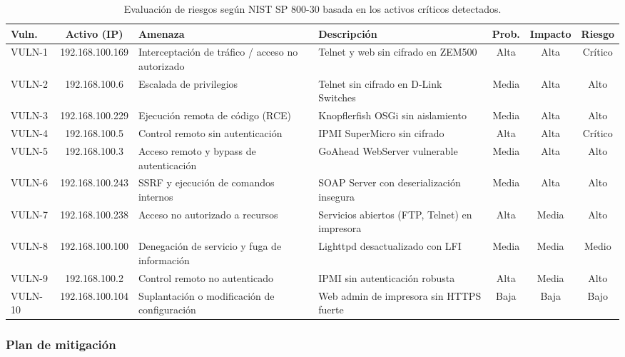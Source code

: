 \documentclass[a4paper, 11pt]{article}
\begin{document}
\begin{table}[H]
\centering
\small
\begin{tabular}{|p{1.3cm}|c|p{3.5cm}|p{3.5cm}|c|c|c|}
\hline
\rowcolor{gray!20}
\textbf{Vuln.} & \textbf{Activo (IP)} & \textbf{Amenaza} & \textbf{Descripción} & \textbf{Prob.} & \textbf{Impacto} & \textbf{Riesgo} \\
\hline
VULN-1 & 192.168.100.169 & Interceptación de tráfico / acceso no autorizado & Telnet y web sin cifrado en ZEM500 & Alta & Alta & \cellcolor{red!40}Crítico \\
\hline
VULN-2 & 192.168.100.6 & Escalada de privilegios & Telnet sin cifrado en D-Link Switches & Media & Alta & \cellcolor{orange!40}Alto \\
\hline
VULN-3 & 192.168.100.229 & Ejecución remota de código (RCE) & Knopflerfish OSGi sin aislamiento & Media & Alta & \cellcolor{orange!40}Alto \\
\hline
VULN-4 & 192.168.100.5 & Control remoto sin autenticación & IPMI SuperMicro sin cifrado & Alta & Alta & \cellcolor{red!40}Crítico \\
\hline
VULN-5 & 192.168.100.3 & Acceso remoto y bypass de autenticación & GoAhead WebServer vulnerable & Media & Alta & \cellcolor{orange!40}Alto \\
\hline
VULN-6 & 192.168.100.243 & SSRF y ejecución de comandos internos & SOAP Server con deserialización insegura & Media & Alta & \cellcolor{orange!40}Alto \\
\hline
VULN-7 & 192.168.100.238 & Acceso no autorizado a recursos & Servicios abiertos (FTP, Telnet) en impresora & Alta & Media & \cellcolor{orange!40}Alto \\
\hline
VULN-8 & 192.168.100.100 & Denegación de servicio y fuga de información & Lighttpd desactualizado con LFI & Media & Media & \cellcolor{yellow!40}Medio \\
\hline
VULN-9 & 192.168.100.2 & Control remoto no autenticado & IPMI sin autenticación robusta & Alta & Media & \cellcolor{orange!40}Alto \\
\hline
VULN-10 & 192.168.100.104 & Suplantación o modificación de configuración & Web admin de impresora sin HTTPS fuerte & Baja & Baja & \cellcolor{green!40}Bajo \\
\hline
\end{tabular}
\caption{Evaluación de riesgos según NIST SP 800-30 basada en los activos críticos detectados.}
\end{table}


\subsubsection*{Plan de mitigación}
\end{document}
